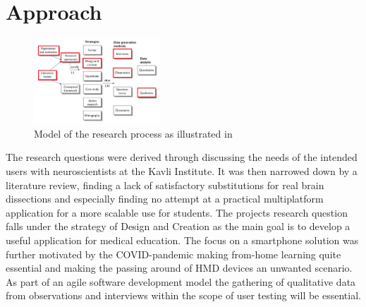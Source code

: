 


\section{Approach}



\begin{figure}
    \begin{center}
        \includegraphics[width=0.42\textwidth]{fig/researchplan_image}
    \end{center}
    \caption{Model of the research process as illustrated in \citet{oates2006}}
    \label{researchplan_img}
\end{figure}

The research questions were derived through discussing the needs of the intended users with neuroscientists at the Kavli Institute. It was then narrowed down by a literature review, finding a lack of satisfactory substitutions for real brain dissections and especially finding no attempt at a practical multiplatform application for a more scalable use for students. The projects research question falls under the strategy of Design and Creation as the main goal is to develop a useful application for medical education. The focus on a smartphone solution was further motivated by the COVID-pandemic making from-home learning quite essential and making the passing around of HMD devices an unwanted scenario. As part of an agile software development model the gathering of qualitative data from observations and interviews within the scope of user testing will be essential. 

